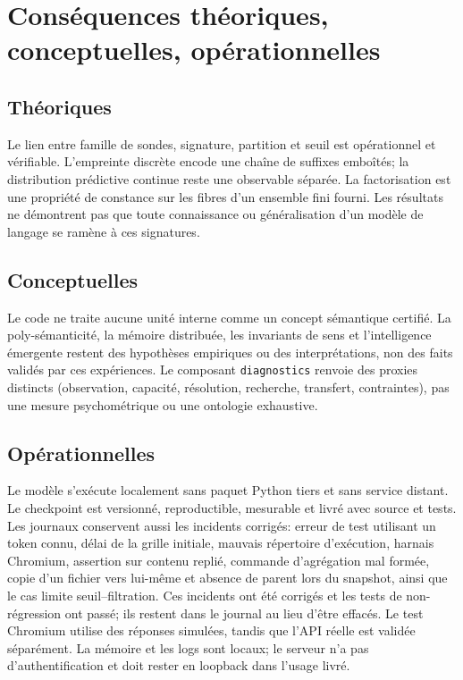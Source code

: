 \documentclass[11pt,a4paper]{article}
\begin{document}
\section{Conséquences théoriques, conceptuelles, opérationnelles}
\subsection{Théoriques}
Le lien entre famille de sondes, signature, partition et seuil est opérationnel et vérifiable. L'empreinte discrète encode une chaîne de suffixes emboîtés; la distribution prédictive continue reste une observable séparée. La factorisation est une propriété de constance sur les fibres d'un ensemble fini fourni. Les résultats ne démontrent pas que toute connaissance ou généralisation d'un modèle de langage se ramène à ces signatures.
\subsection{Conceptuelles}
Le code ne traite aucune unité interne comme un concept sémantique certifié. La poly-sémanticité, la mémoire distribuée, les invariants de sens et l'intelligence émergente restent des hypothèses empiriques ou des interprétations, non des faits validés par ces expériences. Le composant \texttt{diagnostics} renvoie des proxies distincts (observation, capacité, résolution, recherche, transfert, contraintes), pas une mesure psychométrique ou une ontologie exhaustive.
\subsection{Opérationnelles}
Le modèle s'exécute localement sans paquet Python tiers et sans service distant. Le checkpoint est versionné, reproductible, mesurable et livré avec source et tests. Les journaux conservent aussi les incidents corrigés: erreur de test utilisant un token connu, délai de la grille initiale, mauvais répertoire d'exécution, harnais Chromium, assertion sur contenu replié, commande d'agrégation mal formée, copie d'un fichier vers lui-même et absence de parent lors du snapshot, ainsi que le cas limite seuil--filtration. Ces incidents ont été corrigés et les tests de non-régression ont passé; ils restent dans le journal au lieu d'être effacés. Le test Chromium utilise des réponses simulées, tandis que l'API réelle est validée séparément. La mémoire et les logs sont locaux; le serveur n'a pas d'authentification et doit rester en loopback dans l'usage livré.
\end{document}
